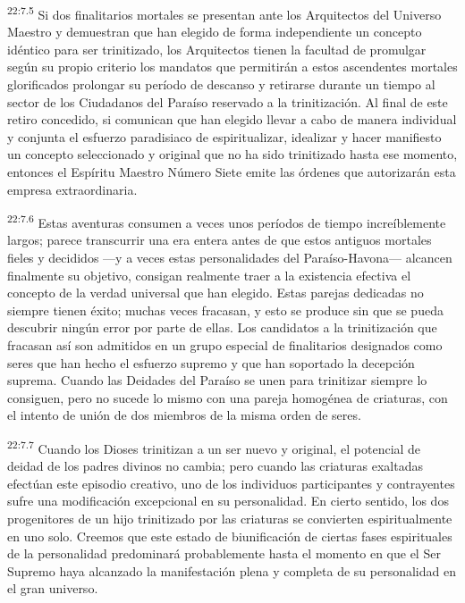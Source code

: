 \par
\textsuperscript{22:7.5} Si dos finalitarios mortales se presentan ante los Arquitectos del Universo Maestro y demuestran que han elegido de forma independiente un concepto idéntico para ser trinitizado, los Arquitectos tienen la facultad de promulgar según su propio criterio los mandatos que permitirán a estos ascendentes mortales glorificados prolongar su período de descanso y retirarse durante un tiempo al sector de los Ciudadanos del Paraíso reservado a la trinitización. Al final de este retiro concedido, si comunican que han elegido llevar a cabo de manera individual y conjunta el esfuerzo paradisiaco de espiritualizar, idealizar y hacer manifiesto un concepto seleccionado y original que no ha sido trinitizado hasta ese momento, entonces el Espíritu Maestro Número Siete emite las órdenes que autorizarán esta empresa extraordinaria.

\par
\textsuperscript{22:7.6} Estas aventuras consumen a veces unos períodos de tiempo increíblemente largos; parece transcurrir una era entera antes de que estos antiguos mortales fieles y decididos ---y a veces estas personalidades del Paraíso-Havona--- alcancen finalmente su objetivo, consigan realmente traer a la existencia efectiva el concepto de la verdad universal que han elegido. Estas parejas dedicadas no siempre tienen éxito; muchas veces fracasan, y esto se produce sin que se pueda descubrir ningún error por parte de ellas. Los candidatos a la trinitización que fracasan así son admitidos en un grupo especial de finalitarios designados como seres que han hecho el esfuerzo supremo y que han soportado la decepción suprema. Cuando las Deidades del Paraíso se unen para trinitizar siempre lo consiguen, pero no sucede lo mismo con una pareja homogénea de criaturas, con el intento de unión de dos miembros de la misma orden de seres.

\par
\textsuperscript{22:7.7} Cuando los Dioses trinitizan a un ser nuevo y original, el potencial de deidad de los padres divinos no cambia; pero cuando las criaturas exaltadas efectúan este episodio creativo, uno de los individuos participantes y contrayentes sufre una modificación excepcional en su personalidad. En cierto sentido, los dos progenitores de un hijo trinitizado por las criaturas se convierten espiritualmente en uno solo. Creemos que este estado de biunificación de ciertas fases espirituales de la personalidad predominará probablemente hasta el momento en que el Ser Supremo haya alcanzado la manifestación plena y completa de su personalidad en el gran universo.

